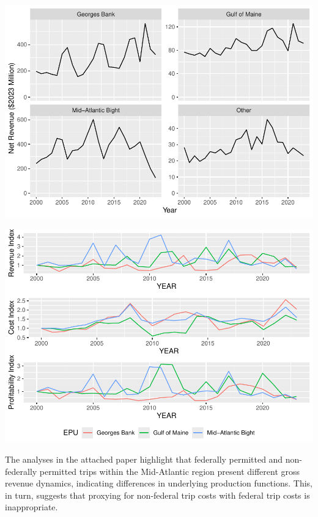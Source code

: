 \documentclass[
  10pt,
]{article}
\let\origfigure\figure
\let\endorigfigure\endfigure
\renewenvironment{figure}[1][2] {
    \expandafter\origfigure\expandafter[H]
} {
    \endorigfigure
}
\begin{document}
\begin{figure}

{\centering \includegraphics[width=0.8\linewidth]{images/netrev-1} 

}

\caption{Net revenue generated by federally permitted trips}\label{fig:netrev}
\end{figure}

\begin{figure}

{\centering \includegraphics[width=0.8\linewidth]{images/Profitability-1} 

}

\caption{Revenue, Cost, and Profitability Indices by region}\label{fig:profits}
\end{figure}

The analyses in the attached paper highlight that federally permitted
and non-federally permitted trips within the Mid-Atlantic region present
different gross revenue dynamics, indicating differences in underlying
production functions. This, in turn, suggests that proxying for
non-federal trip costs with federal trip costs is inappropriate.
\end{document}
